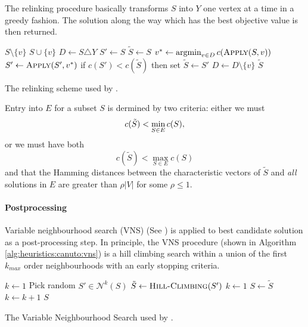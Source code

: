 The relinking procedure basically transforms $S$ into $Y$ one vertex at a time in a greedy fashion.
The solution along the way which has the best objective value is then returned.
 \begin{algorithm}[h!]
   \begin{algorithmic}[1]
     \State \Return $S \setminus \{v\}$
     \Else
     \State \Return $S \cup \{v\}$
     \EndIf
     \EndProcedure
     \State $D \gets S \triangle Y$
     \State $S' \gets S$
     \State $\tilde{S} \gets S$
     \State $v^* \gets \argmin_{v \in D} c(\Call{Apply}{S,v})$
     \State $S' \gets \Call{Apply}{S', v^*}$
     \State if $c(S') < c(\tilde{S})$ then set $\tilde{S} \gets S'$
     \State $D \gets D \setminus \{v\}$
     \EndWhile
     \State \Return $\tilde{S}$
     \EndProcedure
 \end{algorithmic}
 \caption{The relinking scheme used by \cite{canuto2001local}.}\label{heuristics:canuto:relink}
 \end{algorithm}

 Entry into $E$ for a subset $S$ is dermined by two criteria:
 either we must
 $$c(\tilde{S}) < \min_{S \in E} c(S)\mathnormal{,}$$
 or we must have both
 $$c(\tilde{S}) < \max_{S \in E} c(S)$$
  and that the Hamming distances between the characteristic vectors of $\tilde{S}$
   and \textit{all} solutions in $E$ are greater than $\rho |V|$ for some $\rho \leq 1$. 

\paragraph{Postprocessing}
Variable neighbourhood search (VNS) (See \cite{hansen2010variable}) is applied
to best candidate solution as a post-processing step. In principle, the VNS
procedure (shown in Algorithm \ref{alg:heuristics:canuto:vns}) is a hill climbing
search within a union of the first $k_{max}$ order neighbourhoods with an early stopping
 criteria.
\begin{algorithm}[h!]
   \begin{algorithmic}[1]
     \State $k \gets 1$
     \State Pick random $S' \in \mathcal{N}^k(S)$
     \State $\tilde{S} \gets \Call{Hill-Climbing}{S'}$
     \State $k \gets 1$
     \State $S \gets \tilde{S}$
     \Else
     \State $k \gets k + 1$
     \EndIf
     \EndWhile
     \EndFor
     \State \Return $S$
     \EndProcedure
 \end{algorithmic}
 \caption{The Variable Neighbourhood Search
   used by \cite{canuto2001local}.}\label{alg:heuristics:canuto:vns}
 \end{algorithm}

